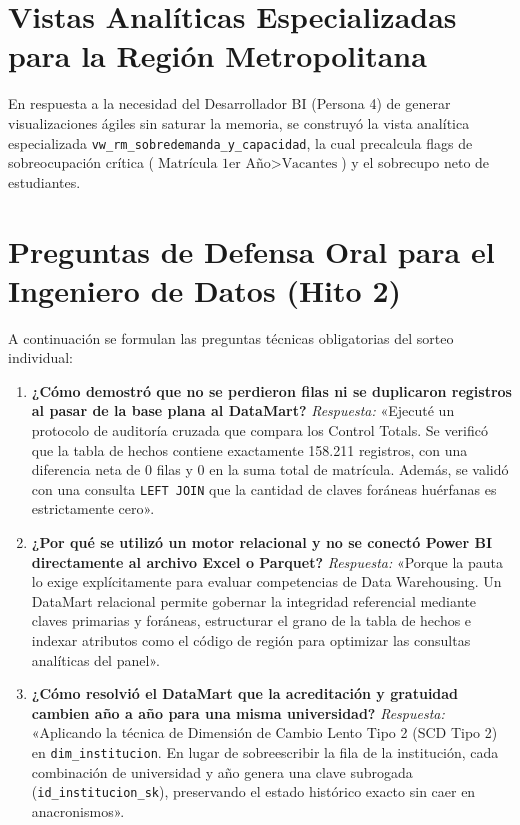 \documentclass[11pt,a4paper]{article}
\begin{document}
\section{Vistas Analíticas Especializadas para la Región Metropolitana}
En respuesta a la necesidad del Desarrollador BI (Persona 4) de generar visualizaciones ágiles sin saturar la memoria, se construyó la vista analítica especializada \texttt{vw\_rm\_sobredemanda\_y\_capacidad}, la cual precalcula flags de sobreocupación crítica ($\text{Matrícula 1er Año} > \text{Vacantes}$) y el sobrecupo neto de estudiantes.

\section{Preguntas de Defensa Oral para el Ingeniero de Datos (Hito 2)}
A continuación se formulan las preguntas técnicas obligatorias del sorteo individual:

\begin{enumerate}
    \item \textbf{¿Cómo demostró que no se perdieron filas ni se duplicaron registros al pasar de la base plana al DataMart?}
    \newline \textit{Respuesta:} «Ejecuté un protocolo de auditoría cruzada que compara los Control Totals. Se verificó que la tabla de hechos contiene exactamente 158.211 registros, con una diferencia neta de 0 filas y 0 en la suma total de matrícula. Además, se validó con una consulta \texttt{LEFT JOIN} que la cantidad de claves foráneas huérfanas es estrictamente cero».

    \item \textbf{¿Por qué se utilizó un motor relacional y no se conectó Power BI directamente al archivo Excel o Parquet?}
    \newline \textit{Respuesta:} «Porque la pauta lo exige explícitamente para evaluar competencias de Data Warehousing. Un DataMart relacional permite gobernar la integridad referencial mediante claves primarias y foráneas, estructurar el grano de la tabla de hechos e indexar atributos como el código de región para optimizar las consultas analíticas del panel».

    \item \textbf{¿Cómo resolvió el DataMart que la acreditación y gratuidad cambien año a año para una misma universidad?}
    \newline \textit{Respuesta:} «Aplicando la técnica de Dimensión de Cambio Lento Tipo 2 (SCD Tipo 2) en \texttt{dim\_institucion}. En lugar de sobreescribir la fila de la institución, cada combinación de universidad y año genera una clave subrogada (\texttt{id\_institucion\_sk}), preservando el estado histórico exacto sin caer en anacronismos».
\end{enumerate}
\end{document}
